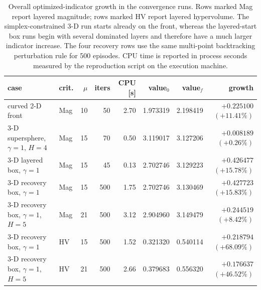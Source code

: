 \documentclass{article}
\begin{document}
\begin{table}[htbp]
\centering
\small
\setlength{\tabcolsep}{3pt}
\begin{tabular}{llrrrrrr}
\hline
case & crit. & $\mu$ & iters & CPU [s] & value$_0$ & value$_f$ & growth \\
\hline
curved 2-D front & Mag & 10 & 50 & 2.70 & 1.973319 & 2.198419 & $+0.225100$ $(+11.41\%)$ \\
3-D supersphere, $\gamma=1$, $H=4$ & Mag & 15 & 70 & 0.50 & 3.119017 & 3.127206 & $+0.008189$ $(+0.26\%)$ \\
3-D layered box, $\gamma=1$ & Mag & 15 & 45 & 0.13 & 2.702746 & 3.129223 & $+0.426477$ $(+15.78\%)$ \\
3-D recovery box, $\gamma=1$ & Mag & 15 & 500 & 1.75 & 2.702746 & 3.130469 & $+0.427723$ $(+15.83\%)$ \\
3-D recovery box, $\gamma=1$, $H=5$ & Mag & 21 & 500 & 3.12 & 2.904960 & 3.149479 & $+0.244519$ $(+8.42\%)$ \\
3-D recovery box, $\gamma=1$ & HV & 15 & 500 & 1.52 & 0.321320 & 0.540114 & $+0.218794$ $(+68.09\%)$ \\
3-D recovery box, $\gamma=1$, $H=5$ & HV & 21 & 500 & 2.66 & 0.379683 & 0.556320 & $+0.176637$ $(+46.52\%)$ \\
\hline
\end{tabular}
\caption{Overall optimized-indicator growth in the convergence runs.  Rows marked Mag report layered magnitude; rows marked HV report layered hypervolume.  The simplex-constrained 3-D run starts already on the front, whereas the layered-start box runs begin with several dominated layers and therefore have a much larger indicator increase.  The four recovery rows use the same multi-point backtracking perturbation rule for 500 episodes.  CPU time is reported in process seconds measured by the reproduction script on the execution machine.}
\label{tab:convergence-growth-summary}
\end{table}
\end{document}
